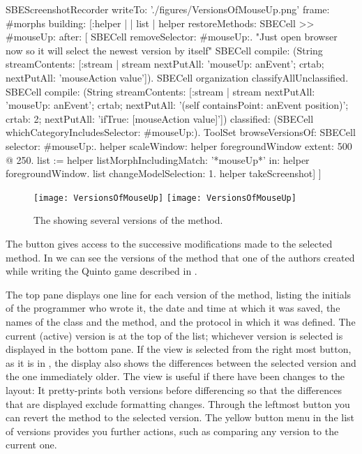 \documentclass[a4paper,10pt,twoside]{book}
\begin{document}
\begin{ExecuteSmalltalkScript}
SBEScreenshotRecorder writeTo: './figures/VersionsOfMouseUp.png' frame: #morphs building: [:helper |
	| list |
	helper restoreMethods: {SBECell >> #mouseUp:} after: [
		SBECell removeSelector: #mouseUp:.
		"Just open browser now so it will select the newest version by itself"
		SBECell
			compile: (String streamContents: [:stream | stream
				nextPutAll: 'mouseUp: anEvent';
				crtab; nextPutAll: 'mouseAction value']).
		SBECell organization classifyAllUnclassified.
		SBECell
			compile: (String streamContents: [:stream | stream
				nextPutAll: 'mouseUp: anEvent';
				crtab; nextPutAll: '(self containsPoint: anEvent position)';
				crtab: 2; nextPutAll: 'ifTrue: [mouseAction value]'])
			classified: (SBECell whichCategoryIncludesSelector: #mouseUp:).
		ToolSet browseVersionsOf: SBECell selector: #mouseUp:.
		helper scaleWindow: helper foregroundWindow extent: 500 @ 250.
		list := helper listMorphIncludingMatch: '*mouseUp*' in: helper foregroundWindow.
		list changeModelSelection: 1.
		helper takeScreenshot]
]
\end{ExecuteSmalltalkScript}
\begin{figure}[btp]
   \centering
   \ifluluelse
	   {\texttt{[image: VersionsOfMouseUp]} }
	   {\texttt{[image: VersionsOfMouseUp]} }
   \caption{The  showing several versions of the  method.}
   \label{fig:mouseUpVersions}
\end{figure}
The  button gives access to the successive modifications made to the selected method.
In  we can see the versions of the  method that one of the authors created while writing the Quinto game described in .

The top pane displays one line for each version of the method, listing the initials of the programmer who wrote it, the date and time at which it was saved, the names of the class and the method, and the protocol in which it was defined.
The current (active) version is at the top of the list; whichever version is selected is displayed in the bottom pane.
If the  view is selected from the right most button, as it is in , the display also shows the differences between the selected version and the one immediately older.
The  view is useful if there have been changes to the layout: It pretty-prints both versions before differencing so that the differences that are displayed exclude formatting changes.
Through the leftmost button you can revert the method to the selected version.
The yellow button menu in the list of versions provides you further actions, such as comparing any version to the current one.
\end{document}

